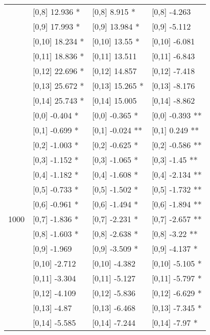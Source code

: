 \begin{table}
\begin{tabular}[t]{llll}
 & {}[0,8] 12.936 * & {}[0,8] 8.915 * & {}[0,8] -4.263\\
 & {}[0,9] 17.993 * & {}[0,9] 13.984 * & {}[0,9] -5.112\\
\addlinespace
 & {}[0,10] 18.234 * & {}[0,10] 13.55 * & {}[0,10] -6.081\\
 & {}[0,11] 18.836 * & {}[0,11] 13.511 & {}[0,11] -6.843\\
 & {}[0,12] 22.696 * & {}[0,12] 14.857 & {}[0,12] -7.418\\
 & {}[0,13] 25.672 * & {}[0,13] 15.265 * & {}[0,13] -8.176\\
 & {}[0,14] 25.743 * & {}[0,14] 15.005 & {}[0,14] -8.862\\
\addlinespace
 & {}[0,0] -0.404 * & {}[0,0] -0.365 * & {}[0,0] -0.393 **\\
 & {}[0,1] -0.699 * & {}[0,1] -0.024 ** & {}[0,1] 0.249 **\\
 & {}[0,2] -1.003 * & {}[0,2] -0.625 * & {}[0,2] -0.586 **\\
 & {}[0,3] -1.152 * & {}[0,3] -1.065 * & {}[0,3] -1.45 **\\
 & {}[0,4] -1.182 * & {}[0,4] -1.608 * & {}[0,4] -2.134 **\\
\addlinespace
 & {}[0,5] -0.733 * & {}[0,5] -1.502 * & {}[0,5] -1.732 **\\
 & {}[0,6] -0.961 * & {}[0,6] -1.494 * & {}[0,6] -1.894 **\\
1000 & {}[0,7] -1.836 * & {}[0,7] -2.231 * & {}[0,7] -2.657 **\\
 & {}[0,8] -1.603 * & {}[0,8] -2.638 * & {}[0,8] -3.22 **\\
 & {}[0,9] -1.969 & {}[0,9] -3.509 * & {}[0,9] -4.137 *\\
\addlinespace
 & {}[0,10] -2.712 & {}[0,10] -4.382 & {}[0,10] -5.105 *\\
 & {}[0,11] -3.304 & {}[0,11] -5.127 & {}[0,11] -5.797 *\\
 & {}[0,12] -4.109 & {}[0,12] -5.836 & {}[0,12] -6.629 *\\
 & {}[0,13] -4.87 & {}[0,13] -6.468 & {}[0,13] -7.345 *\\
 & {}[0,14] -5.585 & {}[0,14] -7.244 & {}[0,14] -7.97 *\\
\bottomrule
\end{tabular}
\end{table}

